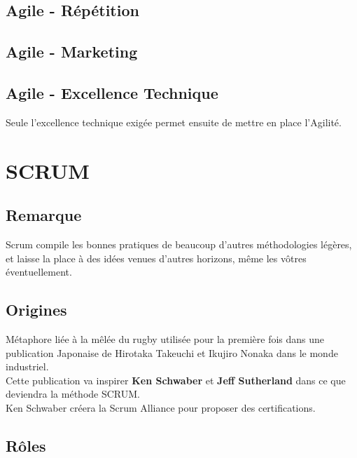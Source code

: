 \documentclass{report}
\begin{document}
	\section{Agile - Répétition}

	\section{Agile - Marketing}

	\section{Agile - Excellence Technique}

		Seule l'excellence technique exigée permet ensuite de mettre en place l'Agilité.\\

\chapter{SCRUM}

	\section{Remarque}

		Scrum compile les bonnes pratiques de beaucoup d'autres méthodologies légères, et laisse la place à des idées venues d'autres horizons, même les vôtres éventuellement.\\

	\section{Origines}

		Métaphore liée à la mêlée du rugby utilisée pour la première fois dans une publication Japonaise de Hirotaka Takeuchi et Ikujiro Nonaka dans le monde industriel.\\

		Cette publication va inspirer \textbf{Ken Schwaber} et \textbf{Jeff Sutherland} dans ce que deviendra la méthode SCRUM.\\

		Ken Schwaber créera la Scrum Alliance pour proposer des certifications.\\

	\section{Rôles}
\end{document}
